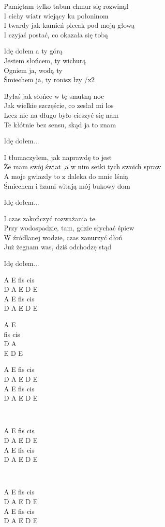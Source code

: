 \begin{text}
    Pamiętam tylko tabun chmur się rozwinął\\    
    I cichy wiatr wiejący ku połoninom\\
    I twardy jak kamień plecak pod moją głową\\
    I czyjaś postać, co okazała się tobą

    \vin Idę dołem a ty górą\\
    \vin Jestem słońcem, ty wichurą\\
    \vin Ogniem ja, wodą ty\\
    \vin Śmiechem ja, ty ronisz łzy /x2

    Byłaś jak słońce w tę smutną noc\\ 
    Jak wielkie szczęście, co zesłał mi los\\ 
    Lecz nie na długo było cieszyć się nam\\ 
    Te kłótnie bez sensu, skąd ja to znam

    \vin Idę dołem...

    I tłumaczyłem, jak naprawdę to jest\\
    Że mam swój świat ,a w nim setki tych swoich spraw\\
    A moje gwiazdy to z daleka do mnie lśnią\\
    Śmiechem i łzami witają mój bukowy dom

    \vin Idę dołem...

    I czas zakończyć rozważania te\\
    Przy wodospadzie, tam, gdzie słychać śpiew\\
    W źródlanej wodzie, czas zanurzyć dłoń\\
    Już żegnam was, dziś odchodzę stąd

    \vin Idę dołem...
\end{text}
\begin{chord}
    A E fis cis\\
    D A E D E\\
    A E fis cis\\
    D A E D E

    A E\\
    fis cis\\
    D A\\
    E D E

    A E fis cis\\
    D A E D E\\
    A E fis cis\\
    D A E D E
    
    ~

    A E fis cis\\
    D A E D E\\
    A E fis cis\\
    D A E D E

    ~

    A E fis cis\\
    D A E D E\\
    A E fis cis\\
    D A E D E
\end{chord}
